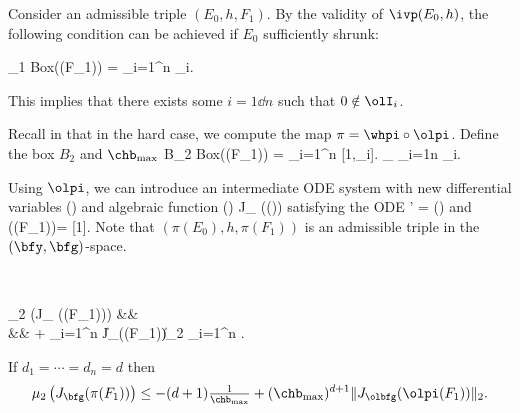 

	Consider an admissible triple $(E_0, h, F_1)$.
	By the validity of $\ivp(E_0,h)$, the following	
	condition can be achieved if $E_0$ sufficiently shrunk:

			\0\nin \olF_1 \as Box(\bff(F_1)) = \prod_{i=1}^n \olI_i.
		\eeql  

	This implies that there exists some $i =1\dd n$ such that
	$0 \notin \olI_i$. 

	Recall in 
	that in the hard case, we compute the
	map $\pi = \whpi \circ \olpi$.
	Define the box $B_2$ and $\chb_{\max}$
			B_2 \as Box(\olpi(F_1)) = \prod_{i=1}^n [1,\chb_i].
					\quad
              \chb_{\max} \as \max_{i=1\dd n} \chb_i.
		\eeql

	Using $\olpi$, we can introduce an intermediate ODE system
		with new differential variables
					\olbfy \as \olpi(\bfx)
			\eeql
		and algebraic function
				\olbfg(\olbfy) \as J_{\olpi} \Bigcdot
							\bff(\olpi\inv(\olbfy))
			\eeql
		satisfying the ODE
					\olbfy' = \olbfg(\olbfy)
				\eeql
		and
			\beql{olbfg}
				\olbfg(\olpi(F_1))\ge \1= [1\dd 1].
			\eeql
	Note that $(\pi(E_0), h, \pi(F_1))$ is
	an admissible triple in the $(\bfy,\bfg)$-space.



	 \ \\
	\benum[(a)]
	\item
		\beqarrys
	 	\mu_2 \big(J_{\bfg} (\pi(F_1))\big)
			&\le&
 			\max{}\\
		&&
			+ \max_{i=1}^n  
        		\cdot
					\|J_{\olbfg}(\olpi(F_1))\|_2
				\cdot
				\max_{i=1}^n .
		\eeqarrys
	\item If $d_1=\cdots=d_n=d$ then
			$$\mu_2 \left(J_{\bfg} (\pi(F_1))\right)
				\le
					-(d+1)\tfrac{1}{\chb_{\max}}
						+(\chb_{\max})^{d+1}
								\|J_{\olbfg}(\olpi(F_1))\|_2.
			$$
	\eenum
	\ethml

